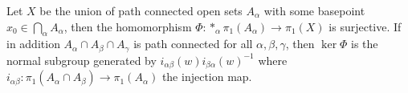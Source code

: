 Let $X$ be the union of path connected open sets $A_\alpha$ with some basepoint $x_0\in \bigcap_\alpha A_\alpha$, then the homomorphism $\Phi: *_\alpha \pi_1(A_\alpha)\to \pi_1(X)$ is surjective. If in addition $A_\alpha\cap A_\beta \cap A_\gamma$ is path connected for all $\alpha,\beta,\gamma$, then $\ker\Phi$ is the normal subgroup generated by $i_{\alpha\beta}(w)i_{\beta\alpha}(w)^{-1}$ where $i_{\alpha\beta}:\pi_1(A_\alpha\cap A_\beta)\to \pi_1(A_\alpha)$ the injection map.